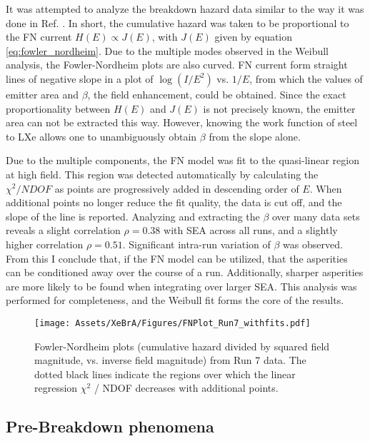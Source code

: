 It was attempted to analyze the breakdown hazard data similar to the way it was done in Ref. \cite{phan_study_2021}.
In short, the cumulative hazard was taken to be proportional to the FN current $H(E) \propto J(E)$,
with $J(E)$ given by equation \ref{eq:fowler_nordheim}.
Due to the multiple modes observed in the Weibull analysis, the Fowler-Nordheim plots are also curved.
FN current form straight lines of negative slope in a plot of $\log(I/E^2)$ vs. $1/E $, from which the values of emitter area and $\beta$, the field enhancement, could be obtained.
Since the exact proportionality between $H(E)$ and $J(E)$ is not precisely known, the emitter area can not be extracted this way.
However, knowing the work function of steel to LXe allows one to unambiguously obtain $\beta$ from the slope alone.

Due to the multiple components, the FN model was fit to the quasi-linear region at high field.
This region was detected automatically by calculating the $\chi^2/NDOF$ as points are progressively added in descending order of $E$.
When additional points no longer reduce the fit quality, the data is cut off, and the slope of the line is reported.
Analyzing and extracting the $\beta$ over many data sets reveals a slight correlation $\rho=0.38$ with SEA across all runs, and a slightly higher correlation $\rho=0.51$.
Significant intra-run variation of $\beta$ was observed.
From this I conclude that, if the FN model can be utilized, that the asperities can be conditioned away over the course of a run.
Additionally, sharper asperities are more likely to be found when integrating over larger SEA.
This analysis was performed for completeness, and the Weibull fit forms the core of the results.


\begin{figure} 
    \centering
    \texttt{[image: Assets/XeBrA/Figures/FNPlot\_Run7\_withfits.pdf]}
    \caption[Fowler-Nordheim plots from a run of XeBrA.]%
    {Fowler-Nordheim plots (cumulative hazard divided by squared field magnitude, vs. inverse field magnitude) from Run 7 data.
    The dotted black lines indicate the regions over which the linear regression $\chi^2$ / NDOF decreases with additional points.}
    \label{fig:fn_hazard}
\end{figure}

\afterpage{\FloatBarrier}
\subsection{Pre-Breakdown phenomena}


